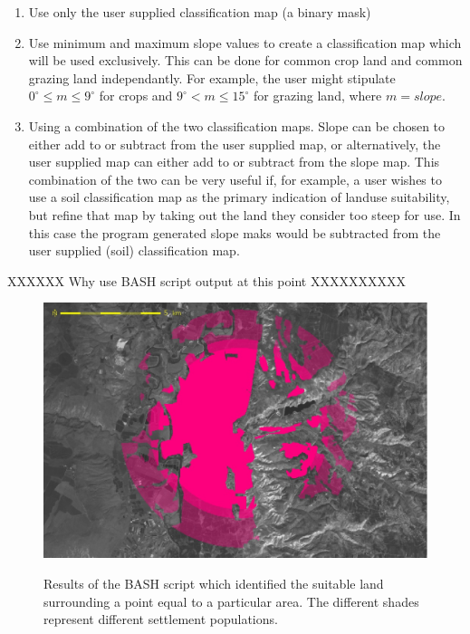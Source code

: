 \begin{enumerate} 

\item  Use only the user supplied classification map (a binary mask) 

\item  Use minimum and maximum slope values to create a classification map
which will be used exclusively.  This can be done for common crop land and
common grazing land independantly.  For example, the user might stipulate
$0^\circ \leq m \leq 9^\circ$ for crops and $9^\circ < m \leq 15^\circ$ for
grazing land, where $m=slope$.  

\item  Using a combination of the two classification maps.  Slope can be chosen
to either add to or subtract from the user supplied map, or alternatively, the
user supplied map can either add to or subtract from the slope map.  This
combination of the two can be very useful if, for example, a user wishes to use
a soil classification map as the primary indication of landuse suitability, but
refine that map by taking out the land they consider too steep for use.  In
this case the program generated slope maks would be subtracted from the user
supplied (soil) classification map.  

\end{enumerate}


XXXXXX Why use BASH script output at this point XXXXXXXXXX


  \begin{figure}[htbp] %
  \includegraphics[scale=0.225]{./images/landcatchment.jpg}
   \label{fig:landCatchment} \caption{Results of the BASH script which
   identified the suitable land surrounding a point equal to a particular area.
   The different shades represent different settlement populations.}
   \end{figure}

